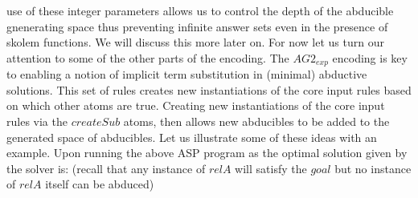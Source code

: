 \documentclass[sigconf]{acmart}
\begin{document}
use of these integer parameters allows us to control the depth of the
abducible gnenerating space thus preventing infinite answer sets even in the
presence of skolem functions. We will discuss this more later on. For now let
us turn our attention to some of the other parts of the encoding. The
$AG2_{exp}$ encoding is key to enabling a notion of implicit term substitution
in (minimal) abductive solutions. This set of rules creates new instantiations
of the core input rules based on which other atoms are true. Creating new
instantiations of the core input rules via the $createSub$ atoms, then allows
new abducibles to be added to the generated space of abducibles. Let us
illustrate some of these ideas with an example. Upon running the above ASP
program as the optimal solution given by the solver is: (recall that any
instance of $relA$ will satisfy the $goal$ but no instance of $relA$ itself
can be abduced) 
\end{document}

